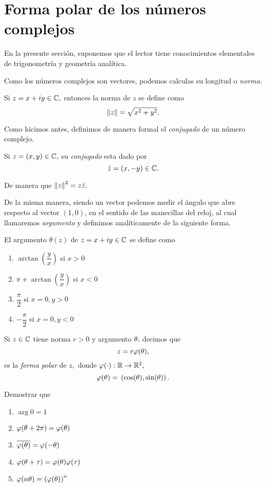  \section{Forma polar de los números complejos}

En la presente sección, suponemos que el lector tiene conocimientos elementales de trigonometría y geometría analítica. 
 
 Como los números complejos son vectores, podemos calculas su longitud o \emph{norma.}

 \begin{defn}
  Si $z=x+iy\in \mathbb{C},$ entonces la norma de $z$ se define como
  $$
\left\| z \right\|=\sqrt{x^{2}+y^{2}}.
  $$
 \end{defn}

 Como hicimos antes, definimos de manera formal el \emph{conjugado} de un número complejo.
 \begin{defn}
  Si $z=(x,y)\in \mathbb{C},$ su \emph{conjugado} esta dado por
  $$
\bar{z}=(x,-y)\in \mathbb{C}.
  $$
 \end{defn}

 De manera que $\left\| z \right\|^{2}=z\bar{z}.$

 De la misma manera, siendo un vector podemos medir el ángulo que abre respecto al vector $(1,0)$, en el sentido de las
manecillas del reloj, al cual llamaremos \emph{argumento} y definimos analíticamente de la siguiente forma.
 \begin{defn}
  El argumento $\theta(z)$ de $z=x+iy\in \mathbb{C}$ se define como
  \begin{enumerate}
   \item $\arctan\left( \dfrac{y}{x} \right)$ si $x>0$
   \item $\pi + \arctan\left( \dfrac{y}{x} \right)$ si $x<0$
   \item $\dfrac{\pi}{2}$ si $x=0, y> 0$
   \item $-\dfrac{\pi}{2}$ si $x=0, y< 0$
  \end{enumerate}
  
 \end{defn}

 \begin{defn}
  Si $z\in \mathbb{C}$ tiene norma $r>0$ y argumento $\theta,$ decimos que $$
z=r\varphi(\theta),
  $$
  es la \emph{forma polar} de $z,$ donde $\varphi(\cdot):\mathbb{R}\to\mathbb{R}^{2},$
  $$
\varphi(\theta)=\, \left( \cos(\theta), \sin (\theta) \right).
  $$
 \end{defn}

 \begin{problema}
  Demostrar que
  \begin{enumerate}
  \item $\arg{0}=1$
   \item $\varphi(\theta+2\pi)=\varphi(\theta)$
   \item $\overline{\varphi(\theta)}=\varphi(-\theta)$
   \item $\varphi(\theta+\tau)=\varphi(\theta)\varphi(\tau)$
   \item $\varphi(n\theta)=\left( \varphi(\theta) \right)^{n}$
  \end{enumerate}

 \end{problema}

